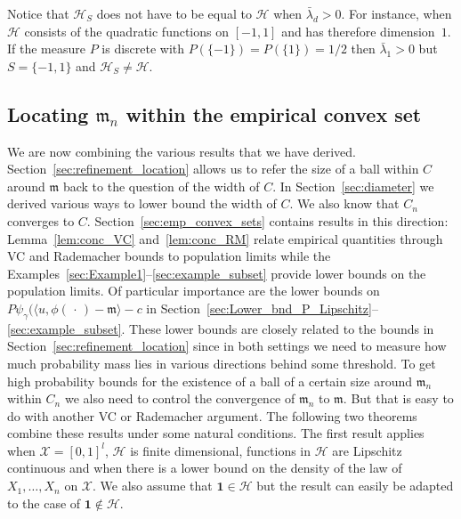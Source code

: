 \documentclass[AHL,Unicode,longabstracts,published]{cedram}
\theoremstyle{remark}
\newcommand{\X}{\mathcal{X}}
\newcommand{\cH}{\mathcal{H}}
\newcommand{\mean}{\mathfrak{m}}
\begin{document}
Notice that $\cH_S$ does not have to be equal to $\cH$ when $\bar \lambda_d > 0$. For instance, when $\cH$ consists of the quadratic functions on $[-1,1]$ and has therefore dimension~$1$. If the measure $P$ is discrete with $P(\{-1\}) = P(\{1\}) = 1/2$ then $\bar \lambda_1 > 0$ but $S = \{ -1,1\}$ and $\cH_S \not = \cH$.

\subsection{Locating \texorpdfstring{$\mean_n$}{mean\_n} within the empirical convex set} \label{sec:bringing_it_together}

We are now combining the various results that we have derived. Section~\ref{sec:refinement_location} allows us to refer the size of a ball within $C$ around $\mean$ back to the question of the width of $C$. In Section~\ref{sec:diameter} we derived various ways to lower bound the width of $C$. We also know that $C_n$ converges to $C$. Section~\ref{sec:emp_convex_sets} contains results in this direction: Lemma~\ref{lem:conc_VC} and~\ref{lem:conc_RM} relate empirical quantities through VC and Rademacher bounds to population limits while the Examples~\ref{sec:Example1}--\ref{sec:example_subset} provide lower bounds on the population limits. Of particular importance are the lower bounds on $P \psi_\gamma(\langle u,\phi(\,\cdot\,) - \mean \rangle -c$ in Section~\ref{sec:Lower_bnd_P_Lipschitz}--\ref{sec:example_subset}. These lower bounds are closely related to the bounds in Section~\ref{sec:refinement_location} since in both settings we need to measure how much probability mass lies in various directions behind some threshold. To get high probability bounds for the existence of a ball of a certain size around $\mean_n$ within $C_n$ we also need to control the convergence of $\mean_n$ to $\mean$. But that is easy to do with another VC or Rademacher argument. The following two theorems combine these results under some natural conditions. The first result applies when $\X =[0,1]^l$, $\cH$ is finite dimensional, functions in $\cH$ are Lipschitz continuous and when there is a lower bound on the density of the law of $X_1,\dots,X_n$ on $\X$. We also assume that $\bm 1 \in \cH$ but the result can easily be adapted to the case of $\bm 1 \not \in \cH$.
\end{document}
